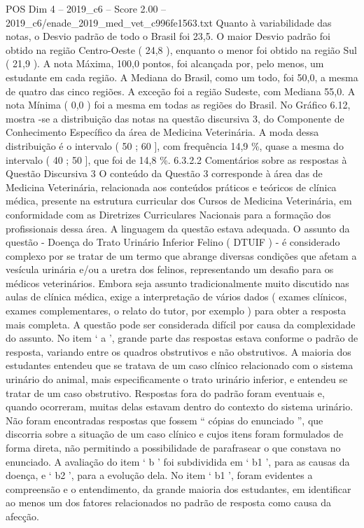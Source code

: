 \begin{textsample}{POS Dim 4 – 2019\_c6 – Score 2.00 – 2019\_c6/enade\_2019\_med\_vet\_c996fe1563.txt}
Quanto à variabilidade das notas, o Desvio padrão de todo o Brasil foi 23,5.
O maior Desvio padrão foi obtido na região Centro-Oeste ( 24,8 ), enquanto o menor foi obtido na região Sul ( 21,9 ).
A nota Máxima, 100,0 pontos, foi alcançada por, pelo menos, um estudante em cada região.
A Mediana do Brasil, como um todo, foi 50,0, a mesma de quatro das cinco regiões.
A exceção foi a região Sudeste, com Mediana 55,0.
A nota Mínima ( 0,0 ) foi a mesma em todas as regiões do Brasil.
No Gráfico 6.12, mostra -se a distribuição das notas na questão discursiva 3, do Componente de Conhecimento Específico da área de Medicina Veterinária.
A moda dessa distribuição é o intervalo ( 50 ; 60 ], com frequência 14,9 \%, quase a mesma do intervalo ( 40 ; 50 ], que foi de 14,8 \%. 6.3.2.2 Comentários sobre as respostas à Questão Discursiva 3 O conteúdo da Questão 3 corresponde à área das de Medicina Veterinária, relacionada aos conteúdos práticos e teóricos de clínica médica, presente na estrutura curricular dos Cursos de Medicina Veterinária, em conformidade com as Diretrizes Curriculares Nacionais para a formação dos profissionais dessa área.
A linguagem da questão estava adequada.
O assunto da questão - Doença do Trato Urinário Inferior Felino ( DTUIF ) - é considerado complexo por se tratar de um termo que abrange diversas condições que afetam a vesícula urinária e/ou a uretra dos felinos, representando um desafio para os médicos veterinários.
Embora seja assunto tradicionalmente muito discutido nas aulas de clínica médica, exige a interpretação de vários dados ( exames clínicos, exames complementares, o relato do tutor, por exemplo ) para obter a resposta mais completa.
A questão pode ser considerada difícil por causa da complexidade do assunto.
No item ‘ a ’, grande parte das respostas estava conforme o padrão de resposta, variando entre os quadros obstrutivos e não obstrutivos.
A maioria dos estudantes entendeu que se tratava de um caso clínico relacionado com o sistema urinário do animal, mais especificamente o trato urinário inferior, e entendeu se tratar de um caso obstrutivo.
Respostas fora do padrão foram eventuais e, quando ocorreram, muitas delas estavam dentro do contexto do sistema urinário.
Não foram encontradas respostas que fossem “ cópias do enunciado ”, que discorria sobre a situação de um caso clínico e cujos itens foram formulados de forma direta, não permitindo a possibilidade de parafrasear o que constava no enunciado.
A avaliação do item ‘ b ’ foi subdividida em ‘ b1 ’, para as causas da doença, e ‘ b2 ’, para a evolução dela.
No item ‘ b1 ’, foram evidentes a compreensão e o entendimento, da grande maioria dos estudantes, em identificar ao menos um dos fatores relacionados no padrão de resposta como causa da afecção.

\end{textsample}
